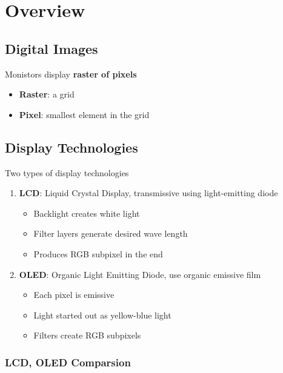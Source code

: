 \chapter{Overview}

\section{Digital Images}

  Monistors display \textbf{raster of pixels}

  \begin{itemize}
    \item \textbf{Raster}: a grid
    \item \textbf{Pixel}: smallest element in the grid
  \end{itemize}

\section{Display Technologies}

  Two types of display technologies

  \begin{enumerate}
    \item \textbf{LCD}: Liquid Crystal Display, transmissive using
    light-emitting diode
    \begin{itemize}
      \item Backlight creates white light
      \item Filter layers generate desired wave length
      \item Produces RGB subpixel in the end
    \end{itemize}

    \item \textbf{OLED}: Organic Light Emitting Diode, use organic emissive
    film
    \begin{itemize}
      \item Each pixel is emissive
      \item Light started out as yellow-blue light
      \item Filters create RGB subpixels
    \end{itemize}
  \end{enumerate}

  \subsection{LCD, OLED Comparsion}

